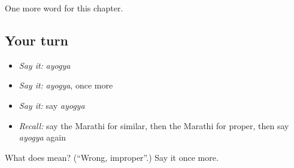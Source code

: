 \begin{grammarlens}[title={What you've built}]
One more word for this chapter.
\end{grammarlens}

\subsection*{Your turn}
\begin{itemize}
\raggedright
  \item \emph{Say it:} \emph{ayogya}
  \item \emph{Say it:} \emph{ayogya}, once more
  \item \emph{Say it:} say \emph{ayogya}
  \item \emph{Recall:} say the Marathi for similar, then the Marathi for proper, then say \emph{ayogya} again
\end{itemize}

\begin{tcolorbox}[breakable,colback=teal!4,colframe=teal!35!black,title={Before you move on}]
What does  mean? (\textquotedblleft{}Wrong, improper\textquotedblright{}.) Say it once more.
\end{tcolorbox}
